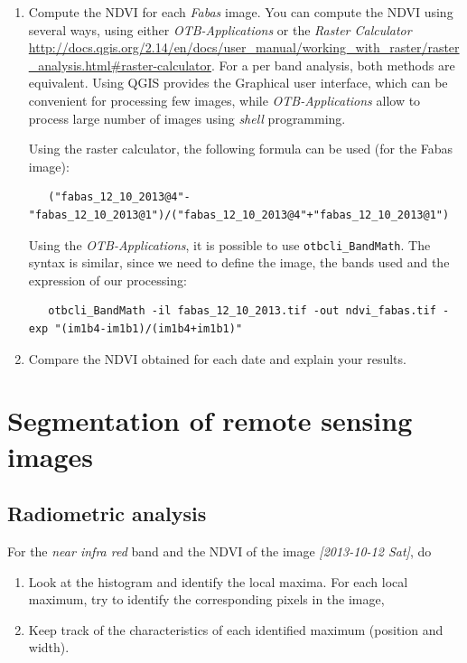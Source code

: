 \documentclass[a4paper,11pt,DIV=18]{scrartcl}
\begin{document}
\begin{work}
\begin{enumerate}
\item Compute  the NDVI for each  \emph{Fabas} image.  You can  compute the NDVI
using several  ways, using  either \emph{OTB-Applications} or  the \emph{Raster
Calculator}
\url{http://docs.qgis.org/2.14/en/docs/user\_manual/working\_with\_raster/raster\_analysis.html\#raster-calculator}.
For a per  band analysis, both methods are  equivalent.  Using QGIS
provides the Graphical user interface,  which can be convenient for
processing  few images,  while  \emph{OTB-Applications}  allow to  process
large number of images using \emph{shell} programming.

Using the raster calculator, the following formula can be used (for
the Fabas image):

\begin{verbatim}
   ("fabas_12_10_2013@4"-"fabas_12_10_2013@1")/("fabas_12_10_2013@4"+"fabas_12_10_2013@1")
\end{verbatim}

Using    the   \emph{OTB-Applications},    it   is    possible   to    use
\texttt{otbcli\_BandMath}. The syntax is similar, since we need to define the
image, the bands used and the expression of our processing:

\begin{verbatim}
   otbcli_BandMath -il fabas_12_10_2013.tif -out ndvi_fabas.tif -exp "(im1b4-im1b1)/(im1b4+im1b1)"
\end{verbatim}

\item Compare the NDVI obtained for each date and explain your results.
\end{enumerate}
\end{work}
\section{Segmentation of remote sensing images}
\label{sec:org4742ad2}
\subsection{Radiometric analysis}
\label{sec:orga198a8c}
\begin{work}
For   the  \emph{near   infra  red}   band  and   the  NDVI   of  the   image
\textit{[2013-10-12 Sat]}, do
\begin{enumerate}
\item Look  at the  histogram and  identify the  local maxima.   For each
local  maximum, try  to identify  the corresponding  pixels in  the
image,
\item Keep track  of  the characteristics  of  each identified  maximum
(position and width).
\end{enumerate}
\end{work}
\end{document}
